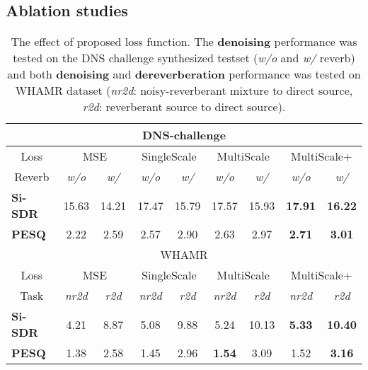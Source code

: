 \documentclass[a4paper]{article}
\begin{document}
\subsection{Ablation studies}
\vspace{-10pt}
\begin{table}[ht]
\caption{The effect of proposed loss function. The \textbf{denoising} performance was tested on the DNS challenge synthesized testset (\textit{w/o} and \textit{w/} reverb) and both \textbf{denoising} and \textbf{dereverberation} performance was tested on WHAMR dataset (\textit{nr2d}: noisy-reverberant mixture to direct source, \textit{r2d}: reverberant source to direct source).}
\begin{center}
\setlength\tabcolsep{1.5pt}
\begin{tabular}{l|cc|cc|cc|cc}
\toprule
\multicolumn{9}{c}{DNS-challenge}\\
\midrule
\multicolumn{1}{c}{Loss}
&\multicolumn{2}{|c}{MSE}&\multicolumn{2}{|c}{SingleScale} &\multicolumn{2}{|c}{MultiScale} &\multicolumn{2}{|c}{MultiScale+}
\\ \midrule
\multicolumn{1}{c}{Reverb} &\multicolumn{1}{|c}{\textit{w/o}} &\multicolumn{1}{c}{\textit{w/}} &\multicolumn{1}{|c}{\textit{w/o}}&\multicolumn{1}{c}{\textit{w/}} &\multicolumn{1}{|c}{\textit{w/o}}&\multicolumn{1}{c}{\textit{w/}} &\multicolumn{1}{|c}{\textit{w/o} }&\multicolumn{1}{c}{\textit{w/}}
\\ \midrule
\bf{Si-SDR} & 15.63 & 14.21 & 17.47 & 15.79 & 17.57 & 15.93 & \bf{17.91} & \bf{16.22} \\
\bf{PESQ} & 2.22 & 2.59 & 2.57 & 2.90 & 2.63 & 2.97 & \bf{2.71} & \bf{3.01} \\
\toprule
\multicolumn{9}{c}{WHAMR}\\
\midrule
\multicolumn{1}{c}{Loss}
&\multicolumn{2}{|c}{MSE}&\multicolumn{2}{|c}{SingleScale} &\multicolumn{2}{|c}{MultiScale} &\multicolumn{2}{|c}{MultiScale+}
\\ \midrule
\multicolumn{1}{c}{Task} &\multicolumn{1}{|c}{\textit{nr2d}} &\multicolumn{1}{c}{\textit{r2d}} &\multicolumn{1}{|c}{\textit{nr2d}}&\multicolumn{1}{c}{\textit{r2d}} &\multicolumn{1}{|c}{\textit{nr2d}}&\multicolumn{1}{c}{\textit{r2d}} &\multicolumn{1}{|c}{\textit{nr2d} }&\multicolumn{1}{c}{\textit{r2d}}
\\ \midrule
\bf{Si-SDR} & 4.21 & 8.87 & 5.08 & 9.88 & 5.24 & 10.13 & \bf{5.33} & \bf{10.40} \\
\bf{PESQ} & 1.38 & 2.58 & 1.45 & 2.96 & \bf{1.54} & 3.09 & 1.52 & \bf{3.16} \\
\bottomrule
\end{tabular}
\end{center}
\label{table:loss_comparison}
\end{table}
\end{document}
